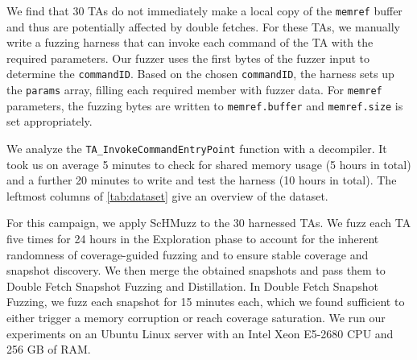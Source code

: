 \documentclass[letterpaper,twocolumn,10pt]{article}
\newcommand{\sysname}{ScHMuzz\xspace}
\newcommand{\stageone}{Exploration\xspace}
\newcommand{\stagetwo}{Double Fetch Snapshot Fuzzing\xspace}
\newcommand{\stagethree}{Distillation\xspace}
\newcommand{\numTAsharnessed}{30\xspace}
\newcommand{\numruns}{five\xspace}
\begin{document}
We find that \numTAsharnessed TAs do not immediately make a local copy of the \texttt{memref} buffer 
and thus are potentially affected by double fetches. For these TAs, we manually write a fuzzing harness
that can invoke each command of the TA with the required parameters.
Our fuzzer uses the first bytes of the fuzzer input to determine the \texttt{commandID}. 
Based on the chosen \texttt{commandID}, the harness sets up the \texttt{params} array, 
filling each required member with fuzzer data. For \texttt{memref} parameters, the fuzzing 
bytes are written to \texttt{memref.buffer} and \texttt{memref.size} is set appropriately.



We analyze the \texttt{TA\_InvokeCommandEntryPoint} function with a decompiler. It took us on average 
5 minutes to check for shared memory usage (5 hours in total) and a further 20 minutes to write and test the harness (10 hours in total). The leftmost columns of \autoref{tab:dataset} give an overview of the dataset.

For this campaign, we apply \sysname to the \numTAsharnessed harnessed TAs. We fuzz each TA \numruns 
times for 24 hours in the \stageone phase to account for the inherent randomness of coverage-guided 
fuzzing and to ensure stable coverage and snapshot discovery. 
We then merge the obtained snapshots and pass them to 
\stagetwo and \stagethree. In \stagetwo, we fuzz each snapshot for 15 minutes each, 
which we found sufficient to either trigger a memory corruption or reach coverage saturation.
We run our experiments on an Ubuntu Linux server with an Intel Xeon E5-2680 CPU and 256 GB of RAM.
\end{document}

